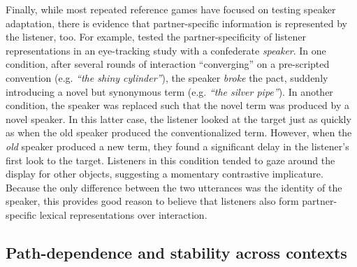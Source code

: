 
Finally, while most repeated reference games have focused on testing speaker adaptation, there is evidence that partner-specific information is represented by the listener, too. For example,  tested the partner-specificity of listener representations in an eye-tracking study with a confederate \emph{speaker}. In one condition, after several rounds of interaction ``converging'' on a pre-scripted convention (e.g. \emph{``the shiny cylinder''}), the speaker \emph{broke} the pact, suddenly introducing a novel but synonymous term (e.g. \emph{``the silver pipe''}). In another condition, the speaker was replaced such that the novel term was produced by a novel speaker. In this latter case, the listener looked at the target just as quickly as when the old speaker produced the conventionalized term. However, when the \emph{old} speaker produced a new term, they found a significant delay in the listener's first look to the target. Listeners in this condition tended to gaze around the display for other objects, suggesting a momentary contrastive implicature. Because the only difference between the two utterances was the identity of the speaker, this provides good reason to believe that listeners also form partner-specific lexical representations over interaction. %

\subsection{Path-dependence and stability across contexts}

